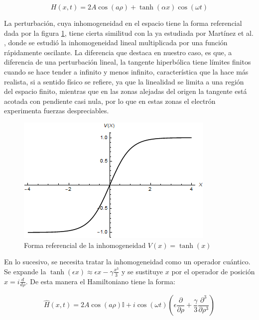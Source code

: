 \begin{equation}\label{eq:10.29}
    H(x,t)=2A\cos(a\rho)+\tanh(\alpha x)\cos(\omega t)
\end{equation}

La perturbación, cuya inhomogeneidad en el espacio tiene la forma referencial dada por la figura \ref{fig:10.1}, tiene cierta similitud con la  ya estudiada por Martínez et al. \cite{martinez2017}, donde se estudió la inhomogeneidad lineal multiplicada por una función rápidamente oscilante. La diferencia que destaca en nuestro caso, es que, a diferencia de una perturbación lineal, la tangente hiperbólica tiene límites finitos cuando se hace tender a infinito y menos infinito, característica que la hace más realista, si a sentido físico se refiere, ya que la linealidad se limita a una región del espacio finito, mientras que en las zonas alejadas del origen la tangente está acotada con pendiente casi nula, por lo que en estas zonas el electrón experimenta fuerzas despreciables.


\begin{figure}[H]
    \centering
    \includegraphics{imagenes/potencial_oscilante.png}
    \caption{Forma referencial de la inhomogeneidad $V(x)=\tanh(x)$}
    \label{fig:10.1}
\end{figure}

En lo sucesivo, se necesita tratar la inhomogeneidad como un operador cuántico. Se expande la $\tanh(\epsilon x)\approx \epsilon x - \gamma\frac{x^3}{3}$ y se sustituye $x$ por el operador de posición $x=i\frac{d}{d\rho}$. De esta manera el Hamiltoniano tiene la forma:

\begin{equation}\label{eq:10.30}
    \hat{H}(x,t)=2A\cos(a\rho)\mathbb{I}+i\cos(\omega t)\left( \epsilon \frac{\partial}{\partial \rho} + \frac{\gamma}{3}\frac{\partial^3}{\partial \rho^3}\right)
\end{equation}

